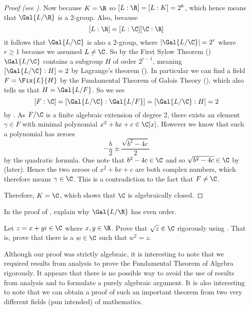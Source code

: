 \begin{proof}[Proof (see {\cite[Theorem 23.34]{judson_beezer_2022}})]
    Now because $K = \R$ so $[L:\R] = [L:K] = 2^k$, which hence means that $\Gal{L/\R}$ is a 2-group. Also, because
    \[
        [L:\R] = [L:\C][\C:\R]
    \]
    it follows that $\Gal{L/\C}$ is also a 2-group, where $|\Gal{L/\C}| = 2^r$ where $r \geq 1$ because we assumed $L \neq \C$. So by the First Sylow Theorem () $\Gal{L/\C}$ contains a subgroup $H$ of order $2^{r-1}$, meaning $[\Gal{L/\C}:H] = 2$ by Lagrange's theorem (). In particular we can find a field $F = \Fix{L}{H}$ by the Fundamental Theorem of Galois Theory (), which also tells us that $H = \Gal{L/F}$. So we see
    \[
        [F:\C] = [\Gal{L/\C}:\Gal{L/F}] = [\Gal{L/\C}:H] = 2
    \]
    by . As $F/\C$ is a finite algebraic extension of degree 2, there exists an element $\gamma \in F$ with minimal polynomial $x^2 + bx + c \in \C[x]$. However we know that such a polynomial has zeroes
    \[
        -\frac b2 \pm \frac{\sqrt{b^2 - 4c}}2
    \]
    by the quadratic formula. One note that $b^2 - 4c \in \C$ and so $\sqrt{b^2-4c} \in \C$ by  (later). Hence the two zeroes of $x^2 + bx + c$ are both complex numbers, which therefore means $\gamma \in \C$. This is a contradiction to the fact that $F \neq \C$.

    Therefore, $K = \C$, which shows that $\C$ is algebraically closed.
\end{proof}

\begin{exercise}\label{exercise-fta-real-extension-has-even-order}
    In the proof of , explain why $\Gal{L/\R}$ has even order.
\end{exercise}

\begin{exercise}\label{exercise-square-root-of-complex-number-is-complex-number}
    Let $z = x + yi \in \C$ where $x, y \in \R$. Prove that $\sqrt{z} \in \C$ rigorously using . That is, prove that there is a $w \in \C$ such that $w^2 = z$.
\end{exercise}

Although our proof was strictly algebraic, it is interesting to note that we required results from analysis to prove the Fundamental Theorem of Algebra rigorously. It appears that there is no possible way to avoid the use of results from analysis and to formulate a purely algebraic argument. It is also interesting to note that we can obtain a proof of such an important theorem from two very different fields (pun intended) of mathematics.
